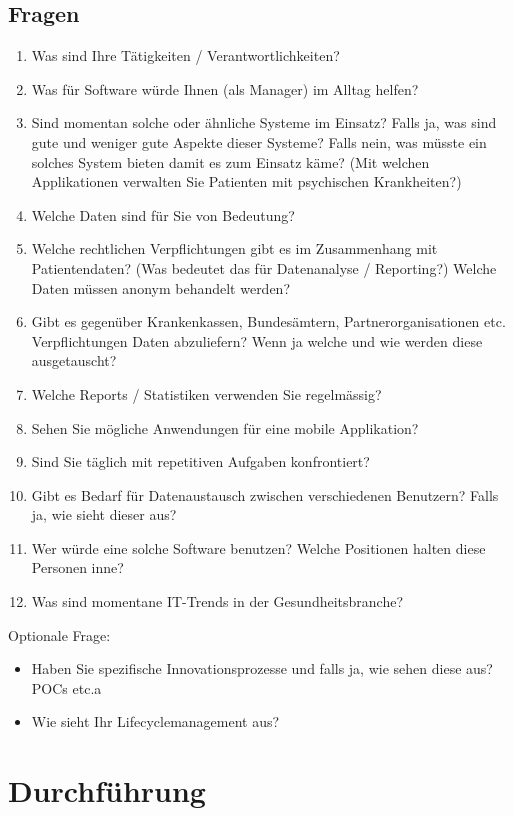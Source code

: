 \documentclass[a4paper]{scrartcl}
\begin{document}
\subsection{Fragen}
\begin{enumerate}
\item Was sind Ihre Tätigkeiten / Verantwortlichkeiten?
\item Was für Software würde Ihnen (als Manager) im Alltag helfen?
\item Sind momentan solche oder ähnliche Systeme im Einsatz? Falls ja, was sind gute und weniger gute Aspekte dieser Systeme? Falls nein, was müsste ein solches System bieten damit es zum Einsatz käme? (Mit welchen Applikationen verwalten Sie Patienten mit psychischen Krankheiten?)
\item Welche Daten sind für Sie von Bedeutung?
\item Welche rechtlichen Verpflichtungen gibt es im Zusammenhang mit Patientendaten? (Was bedeutet das für Datenanalyse / Reporting?) Welche Daten müssen anonym behandelt werden?
\item Gibt es gegenüber Krankenkassen, Bundesämtern, Partnerorganisationen etc. Verpflichtungen Daten abzuliefern? Wenn ja welche und wie werden diese ausgetauscht?
\item Welche Reports / Statistiken verwenden Sie regelmässig?
\item Sehen Sie mögliche Anwendungen für eine mobile Applikation?
\item Sind Sie täglich mit repetitiven Aufgaben konfrontiert?

\item Gibt es Bedarf für Datenaustausch zwischen verschiedenen Benutzern? Falls ja, wie sieht dieser aus?
\item Wer würde eine solche Software benutzen? Welche Positionen halten diese Personen inne?
\item Was sind momentane IT-Trends in der Gesundheitsbranche?

\end{enumerate}

Optionale Frage:
\begin{itemize}
\item Haben Sie spezifische Innovationsprozesse und falls ja, wie sehen diese aus? POCs etc.a
\item Wie sieht Ihr Lifecyclemanagement aus?
\end{itemize}


\section{Durchführung}
\end{document}
